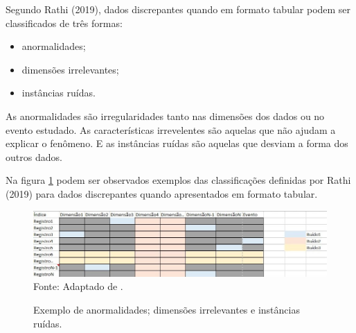 \documentclass[
	12pt,				%
	openright,			%
	oneside,			%
	a4paper,			%
	english,			%
	brazil				%
	]{abntex2}
\begin{document}
			Segundo Rathi (2019), dados discrepantes quando em formato tabular podem ser classificados de três formas:
			\begin{itemize}
				\item anormalidades;
				\item dimensões irrelevantes;
				\item instâncias ruídas.
			\end{itemize}
			As anormalidades são irregularidades tanto nas dimensões dos dados ou no evento estudado.
			As características irrevelentes são aquelas que não ajudam a explicar o fenômeno.
			E as instâncias ruídas são aquelas que desviam a forma dos outros dados. \cite{rathi_2019}
			\par
			Na figura \ref{fig:Rathi} podem ser observados exemplos das classificações definidas por Rathi (2019) para dados discrepantes quando apresentados em formato tabular.

			\begin{figure}[h!]
				\centering
				\caption{Exemplo de anormalidades; dimensões irrelevantes e instâncias ruídas.}
				\includegraphics[width=\linewidth]{./figures/FundamentacaoTeorica/ExemploClassificacaoRuido.jpg}
				\label{fig:Rathi}
				\footnotesize Fonte: Adaptado de \cite{rathi_2019}.
			\end{figure}
			
\end{document}
